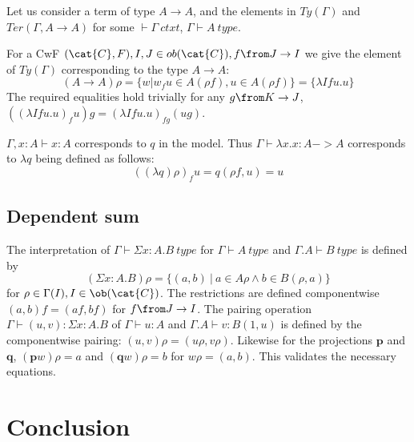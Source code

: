 \begin{example}
  Let us consider a term of type $A \to A$, and the elements in $Ty(\Gamma)$
  and $Ter(\Gamma, A \to A)$ for some $\vdash \Gamma~ctxt$, $\Gamma \vdash
  A~type$.

  For a CwF $(\cat{C}, F), I, J \in ob(\cat{C}), f \from J \to I$ we give the
  element of $\mathit{Ty}(\Gamma)$ corresponding to the type $A \to A$:
  \[
    (A \to A)\rho = \{w | w_f u \in A(\rho f), u \in A(\rho f)\} = \{\lambda I f u.u\}
  \]
  The required equalities hold trivially for any $g \from K \to J$, $((\lambda
  I f u.u)_f u) g = (\lambda I f u.u)_{fg} (ug)$.

  $\Gamma, x : A \vdash x : A$ corresponds to $q$ in the model. Thus $\Gamma
  \vdash \lambda x.x : A -> A$ corresponds to $\lambda q$ being defined as
  follows:
  \[
    ((\lambda q) \rho)_f u = q(\rho f, u) = u
  \]
\end{example}

\subsection*{Dependent sum}
The interpretation of $\Gamma \vdash \Sigma x:A.B~type$ for $\Gamma \vdash
A~type$ and $\Gamma.A \vdash B~type$ is defined by
\[
  (\Sigma x :A. B)\rho = \{(a, b)~|~a \in A\rho \land b \in B(\rho, a)\}
\]
for $\rho \in \Gamma(I), I \in \ob(\cat{C})$. The restrictions are defined
componentwise $(a, b)f = (af, bf)$ for $f \from J \to I$. The pairing operation
$\Gamma \vdash (u, v) : \Sigma x:A.B$ of $\Gamma \vdash u : A$ and $\Gamma.A
\vdash v : B(1, u)$ is defined by the componentwise pairing: $(u, v)\rho =
(u\rho, v\rho)$. Likewise for the projections $\mathbf{p}$ and $\mathbf{q}$,
$(\mathbf{p}w)\rho = a$ and $(\mathbf{q}w)\rho = b$ for $w\rho = (a, b)$. This
validates the necessary equations.

\section*{Conclusion}



